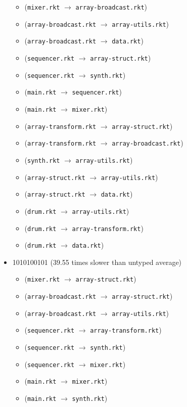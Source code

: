 \documentclass{article}
\newcommand{\mono}[1]{\texttt{#1}}
\begin{document}
\begin{itemize}
\begin{itemize}
  \item (\mono{mixer.rkt} $\rightarrow$ \mono{array-broadcast.rkt})
  \item (\mono{array-broadcast.rkt} $\rightarrow$ \mono{array-utils.rkt})
  \item (\mono{array-broadcast.rkt} $\rightarrow$ \mono{data.rkt})
  \item (\mono{sequencer.rkt} $\rightarrow$ \mono{array-struct.rkt})
  \item (\mono{sequencer.rkt} $\rightarrow$ \mono{synth.rkt})
  \item (\mono{main.rkt} $\rightarrow$ \mono{sequencer.rkt})
  \item (\mono{main.rkt} $\rightarrow$ \mono{mixer.rkt})
  \item (\mono{array-transform.rkt} $\rightarrow$ \mono{array-struct.rkt})
  \item (\mono{array-transform.rkt} $\rightarrow$ \mono{array-broadcast.rkt})
  \item (\mono{synth.rkt} $\rightarrow$ \mono{array-utils.rkt})
  \item (\mono{array-struct.rkt} $\rightarrow$ \mono{array-utils.rkt})
  \item (\mono{array-struct.rkt} $\rightarrow$ \mono{data.rkt})
  \item (\mono{drum.rkt} $\rightarrow$ \mono{array-utils.rkt})
  \item (\mono{drum.rkt} $\rightarrow$ \mono{array-transform.rkt})
  \item (\mono{drum.rkt} $\rightarrow$ \mono{data.rkt})
  \end{itemize}
\item 1010100101 (39.55 times slower than untyped average)
  \begin{itemize}
  \item (\mono{mixer.rkt} $\rightarrow$ \mono{array-struct.rkt})
  \item (\mono{array-broadcast.rkt} $\rightarrow$ \mono{array-struct.rkt})
  \item (\mono{array-broadcast.rkt} $\rightarrow$ \mono{array-utils.rkt})
  \item (\mono{sequencer.rkt} $\rightarrow$ \mono{array-transform.rkt})
  \item (\mono{sequencer.rkt} $\rightarrow$ \mono{synth.rkt})
  \item (\mono{sequencer.rkt} $\rightarrow$ \mono{mixer.rkt})
  \item (\mono{main.rkt} $\rightarrow$ \mono{mixer.rkt})
  \item (\mono{main.rkt} $\rightarrow$ \mono{synth.rkt})

\end{itemize}
\end{itemize}
\end{document}
